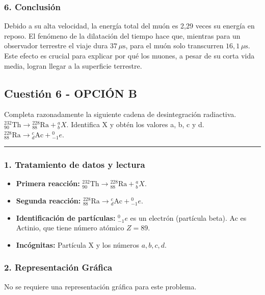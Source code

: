 \subsubsection*{6. Conclusión}
\begin{cajaconclusion}
Debido a su alta velocidad, la energía total del muón es 2,29 veces su energía en reposo. El fenómeno de la dilatación del tiempo hace que, mientras para un observador terrestre el viaje dura $37\,\mu\text{s}$, para el muón solo transcurren $16,1\,\mu\text{s}$. Este efecto es crucial para explicar por qué los muones, a pesar de su corta vida media, logran llegar a la superficie terrestre.
\end{cajaconclusion}

\newpage

\subsection{Cuestión 6 - OPCIÓN B}
\label{subsec:6B_2015_jul_ext}

\begin{cajaenunciado}
Completa razonadamente la siguiente cadena de desintegración radiactiva. ${}_{90}^{232}\text{Th}\longrightarrow{}_{88}^{228}\text{Ra}+{}_{b}^{a}X$. Identifica X y obtén los valores a, b, c y d.
${}_{88}^{228}\text{Ra} \longrightarrow {}_{d}^{c}\text{Ac}+{}_{-1}^{0}e$.
\end{cajaenunciado}
\hrule

\subsubsection*{1. Tratamiento de datos y lectura}
\begin{itemize}
    \item \textbf{Primera reacción:} ${}_{90}^{232}\text{Th} \longrightarrow {}_{88}^{228}\text{Ra} + {}_{b}^{a}X$.
    \item \textbf{Segunda reacción:} ${}_{88}^{228}\text{Ra} \longrightarrow {}_{d}^{c}\text{Ac} + {}_{-1}^{0}e$.
    \item \textbf{Identificación de partículas:} ${}_{-1}^{0}e$ es un electrón (partícula beta). Ac es Actinio, que tiene número atómico $Z=89$.
    \item \textbf{Incógnitas:} Partícula X y los números $a, b, c, d$.
\end{itemize}

\subsubsection*{2. Representación Gráfica}
No se requiere una representación gráfica para este problema.

